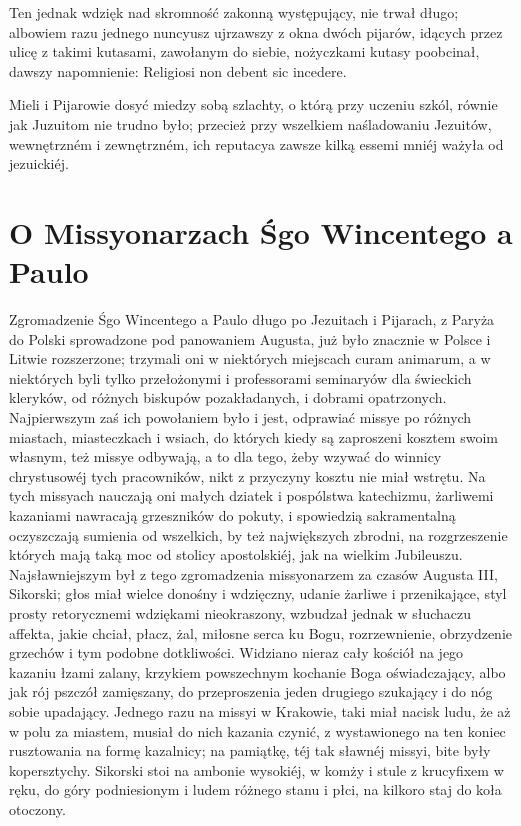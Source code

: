 \documentclass{book}
\begin{document}
Ten jednak wdzięk nad skromność zakonną występujący, nie trwał długo; albowiem razu jednego nuncyusz ujrzawszy z okna dwóch pijarów, idących przez ulicę z takimi kutasami, zawołanym do siebie, nożyczkami kutasy poobcinał, dawszy napomnienie: Religiosi non debent sic incedere.

Mieli i Pijarowie dosyć miedzy sobą szlachty, o którą przy uczeniu szkól, równie jak Juzuitom nie trudno było; przecież przy wszelkiem naśladowaniu Jezuitów, wewnętrzném i zewnętrzném, ich reputacya zawsze kilką essemi mniéj ważyła od jezuickiéj.

\section{O Missyonarzach Śgo Wincentego a Paulo}

Zgromadzenie Śgo Wincentego a Paulo długo po Jezuitach i Pijarach, z Paryża do Polski sprowadzone pod panowaniem Augusta, już było znacznie w Polsce i Litwie rozszerzone; trzymali oni w niektórych miejscach curam animarum, a w niektórych byli tylko przełożonymi i professorami seminaryów dla świeckich kleryków, od różnych biskupów pozakładanych, i dobrami opatrzonych. Najpierwszym zaś ich powołaniem było i jest, odprawiać missye po różnych miastach, miasteczkach i wsiach, do których kiedy są zaproszeni kosztem swoim własnym, też missye odbywają, a to dla tego, żeby wzywać do winnicy chrystusowéj tych pracowników, nikt z przyczyny kosztu nie miał wstrętu. Na tych missyach nauczają oni małych dziatek i pospólstwa katechizmu, żarliwemi kazaniami nawracają grzeszników do pokuty, i spowiedzią sakramentalną oczyszczają sumienia od wszelkich, by też największych zbrodni, na rozgrzeszenie których mają taką moc od stolicy apostolskiéj, jak na wielkim Jubileuszu. Najsławniejszym był z tego zgromadzenia missyonarzem za czasów Augusta III, Sikorski; głos miał wielce donośny i wdzięczny, udanie żarliwe i przenikające, styl prosty retorycznemi wdziękami nieokraszony, wzbudzał jednak w słuchaczu affekta, jakie chciał, płacz, żal, miłosne serca ku Bogu, rozrzewnienie, obrzydzenie grzechów i tym podobne dotkliwości. Widziano nieraz cały kościół na jego kazaniu łzami zalany, krzykiem powszechnym kochanie Boga oświadczający, albo jak rój pszczół zamięszany, do przeproszenia jeden drugiego szukający i do nóg sobie upadający. Jednego razu na missyi w Krakowie, taki miał nacisk ludu, że aż w polu za miastem, musiał do nich kazania czynić, z wystawionego na ten koniec rusztowania na formę kazalnicy; na pamiątkę, téj tak sławnéj missyi, bite były kopersztychy. Sikorski stoi na ambonie wysokiéj, w komży i stule z krucyfixem w ręku, do góry podniesionym i ludem różnego stanu i płci, na kilkoro staj do koła otoczony.
\end{document}
